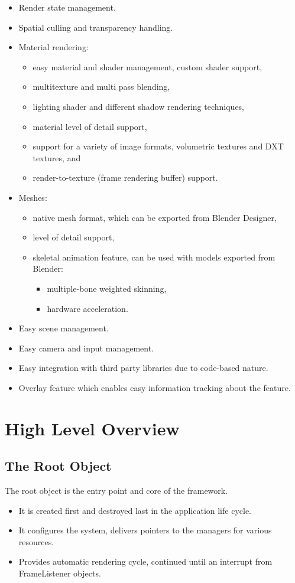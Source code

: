 \begin{itemize}
\item Render state management.
\item Spatial culling and transparency handling.
\item Material rendering:
\begin{itemize}
  \item easy material and shader management, custom shader support,
  \item multitexture and multi pass blending,
  \item lighting shader and different shadow rendering techniques,
  \item material level of detail support,
  \item support for a variety of image formats, volumetric textures and DXT textures, and
  \item render-to-texture (frame rendering buffer) support.
\end{itemize}
\item Meshes:
\begin{itemize}
  \item native mesh format, which can be exported from Blender Designer,
  \item level of detail support,
  \item skeletal animation feature, can be used with models exported from Blender:
\begin{itemize}
  \item multiple-bone weighted skinning, 
  \item hardware acceleration.
\end{itemize}
\end{itemize}
\item Easy scene management.
\item Easy camera and input management.
\item Easy integration with third party libraries due to code-based nature.
\item Overlay feature which enables easy information tracking about the feature.
\end{itemize}

\section{High Level Overview}
\subsection{The Root Object}
The root object is the entry point and core of the framework.
\begin{itemize}
\item It is created first and destroyed last in the application life cycle. 
\item It configures the system, delivers pointers to the managers for various resources.
\item Provides automatic rendering cycle, continued until an interrupt from FrameListener objects.
\end{itemize}

